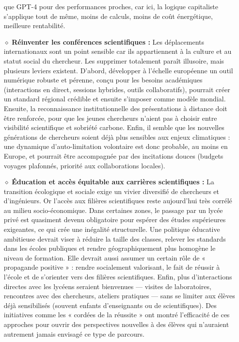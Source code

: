 \documentclass[11pt,a4paper]{article}
\begin{document}
\begin{itemize}
    que GPT-4 pour des performances proches, car ici, la logique capitaliste s'applique tout de même, moins de calculs, moins de coût énergétique, meilleure rentabilité.
    \item[$\diamond$]\textbf{Réinventer les conférences scientifiques :} 
    Les déplacements internationaux sont un point sensible car ils appartiennent à la culture et au statut social du chercheur. 
    Les supprimer totalement paraît illusoire, mais plusieurs leviers existent. 
    D’abord, développer à l’échelle européenne un outil numérique robuste et pérenne, conçu pour les besoins académiques 
    (interactions en direct, sessions hybrides, outils collaboratifs), pourrait créer un standard régional crédible et ensuite 
    s’imposer comme modèle mondial. Ensuite, la reconnaissance institutionnelle des présentations à distance doit être renforcée, 
    pour que les jeunes chercheurs n’aient pas à choisir entre visibilité scientifique et sobriété carbone. 
    Enfin, il semble que les nouvelles générations de chercheurs soient déjà plus sensibles aux enjeux climatiques : 
    une dynamique d’auto-limitation volontaire est donc probable, au moins en Europe, et pourrait être accompagnée 
    par des incitations douces (budgets voyages plafonnés, priorité aux collaborations locales).

    \item[$\diamond$]\textbf{Éducation et accès équitable aux carrières scientifiques :} 
    La transition écologique et sociale exige un vivier diversifié de chercheurs et d’ingénieurs. Or l’accès aux filières scientifiques 
    reste aujourd’hui très corrélé au milieu socio-économique. Dans certaines zones, le passage par un lycée privé est quasiment 
    devenu obligatoire pour espérer des études supérieures exigeantes, ce qui crée une inégalité structurelle.
    Une politique éducative ambitieuse devrait viser à réduire la taille des classes, relever les standards dans les écoles publiques 
    et rendre géographiquement plus homogène le niveau de formation. 
    Elle devrait aussi assumer un certain rôle de « propagande positive » : rendre socialement valorisant,
    le fait de réussir à l’école et de s’orienter vers des filières scientifiques. 
    Enfin, plus d’interactions directes avec les lycéens seraient bienvenues — visites de laboratoires, rencontres avec des chercheurs, 
    ateliers pratiques — sans se limiter aux élèves déjà sensibilisés (souvent enfants d’enseignants ou de scientifiques). 
    Des initiatives comme les « cordées de la réussite » ont montré l’efficacité de ces approches pour ouvrir des perspectives 
    nouvelles à des élèves qui n’auraient autrement jamais envisagé ce type de parcours.
  \end{itemize}
\end{document}
